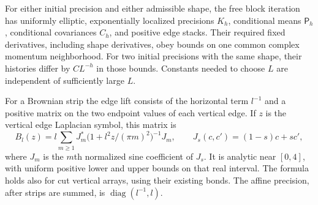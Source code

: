 \begin{lemma}
\label{lem:rg-free}
For either initial precision and either admissible shape, the free block
iteration has uniformly elliptic, exponentially localized precisions
$K_h$, conditional means $\mathsf P_h$, conditional covariances $C_h$,
and positive edge stacks.  Their required fixed derivatives, including
shape derivatives, obey bounds on one common complex momentum
neighborhood.  For two initial precisions with the same shape, their
histories differ by $CL^{-h}$ in those bounds.  Constants needed to
choose $L$ are independent of sufficiently large $L$.

For a Brownian strip the edge lift consists of the horizontal term
$l^{-1}$ and a positive matrix on the two endpoint values of each
vertical edge.  If $z$ is the vertical edge Laplacian symbol, this matrix
is
\begin{equation}
 B_l(z)=l\sum_{m\ge1}J_m^*
          \bigl(1+l^2z/(\pi m)^2\bigr)^{-1}J_m,
 \qquad J_s(c,c')=(1-s)c+sc',
 \label{eq:R3}
\end{equation}
where $J_m$ is the $m$th normalized sine coefficient of $J_s$.  It is
analytic near $[0,4]$, with uniform positive lower and upper bounds on
that real interval.  The formula holds also for cut vertical arrays,
using their existing bonds.  The affine precision, after strips are
summed, is $\operatorname{diag}(l^{-1},l)$.
\end{lemma}

